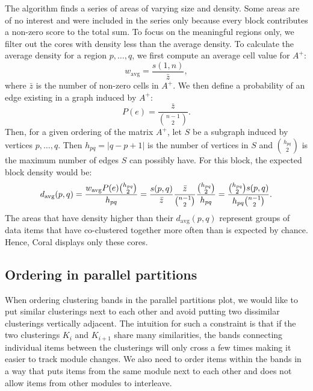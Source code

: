 \documentclass[12pt]{cmuthesis}
\newcommand\Coral{Coral\xspace}
\begin{document}

  The algorithm finds a series of areas of varying size and density. Some areas are of no interest and were included in the series only because every block contributes a non-zero score to the total sum. To focus on the meaningful regions only, we filter out the cores with density less than the average density. To calculate the average density for a region $p, \ldots, q$, we first compute an average cell value for $A^{+}$:
  \[
  w_{\textrm{avg}} = \frac{ s(1, n) } { \bar{z} },
  \]
  where $\bar{z}$ is the number of non-zero cells in $A^{+}$. We then define a probability of an edge existing in a graph induced by $A^{+}$: 
  \[
  P(e) = \frac{\bar{z}}{ {n-1 \choose 2} }.
  \]
  Then, for a given ordering of the matrix $A^{+}$, let $S$ be a subgraph induced by vertices $p, \ldots, q$. Then $h_{pq} = |q-p+1|$ is the number of vertices in $S$ and $h_{pq} \choose 2$ is the maximum number of edges $S$ can possibly have. For this block, the expected block density would be:
  \begin{align*}
  d_{\textrm{\scriptsize avg}}(p, q) =
    \frac{w_{\textrm{avg}} P(e) {h_{pq} \choose 2} }{h_{pq}} =
    \frac{ s(p,q) } { \bar{z} }
          \frac{ \bar{z} }{ {n-1 \choose 2} }
          \frac{ {h_{pq} \choose 2} }{ h_{pq}}
    = \frac{ {h_{pq} \choose 2} s(p,q)}{ h_{pq} {n-1 \choose 2} }.
  \end{align*}
  The areas that have density higher than their $d_{\textrm{avg}}(p,q)$ represent groups of data items that have co-clustered together more often than is expected by chance. Hence, \Coral displays only these cores.

  \subsection{Ordering in parallel partitions}

  When ordering clustering bands in the parallel partitions plot, we would like to put similar clusterings next to each other and avoid putting two dissimilar clusterings vertically adjacent. The intuition for such a constraint is that if the two clusterings $K_{i}$ and $K_{i+1}$ share many similarities, the bands connecting individual items between the clusterings will only cross a few times making it easier to track module changes. We also need to order items within the bands in a way that puts items from the same module next to each other and does not allow items from other modules to interleave.
\end{document}
